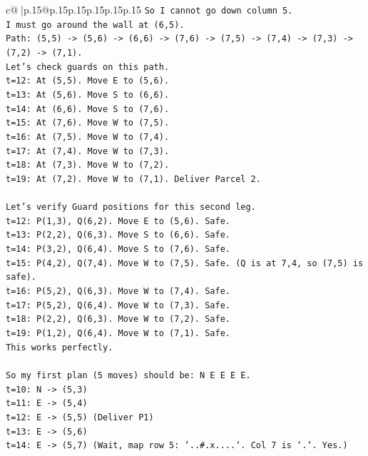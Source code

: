 \documentclass{article}
\begin{document}
{\begin{supertabular}{c@{$\;$}|p{.15\linewidth}@{}p{.15\linewidth}p{.15\linewidth}p{.15\linewidth}p{.15\linewidth}p{.15\linewidth}}
{{{\texttt{So I cannot go down column 5.} \\
\texttt{I must go around the wall at (6,5).} \\
\texttt{Path: (5,5) {-}> (5,6) {-}> (6,6) {-}> (7,6) {-}> (7,5) {-}> (7,4) {-}> (7,3) {-}> (7,2) {-}> (7,1).} \\
\texttt{Let's check guards on this path.} \\
\texttt{t=12: At (5,5). Move E to (5,6).} \\
\texttt{t=13: At (5,6). Move S to (6,6).} \\
\texttt{t=14: At (6,6). Move S to (7,6).} \\
\texttt{t=15: At (7,6). Move W to (7,5).} \\
\texttt{t=16: At (7,5). Move W to (7,4).} \\
\texttt{t=17: At (7,4). Move W to (7,3).} \\
\texttt{t=18: At (7,3). Move W to (7,2).} \\
\texttt{t=19: At (7,2). Move W to (7,1). Deliver Parcel 2.} \\
\\ 
\texttt{Let's verify Guard positions for this second leg.} \\
\texttt{t=12: P(1,3), Q(6,2). Move E to (5,6). Safe.} \\
\texttt{t=13: P(2,2), Q(6,3). Move S to (6,6). Safe.} \\
\texttt{t=14: P(3,2), Q(6,4). Move S to (7,6). Safe.} \\
\texttt{t=15: P(4,2), Q(7,4). Move W to (7,5). Safe. (Q is at 7,4, so (7,5) is safe).} \\
\texttt{t=16: P(5,2), Q(6,3). Move W to (7,4). Safe.} \\
\texttt{t=17: P(5,2), Q(6,4). Move W to (7,3). Safe.} \\
\texttt{t=18: P(2,2), Q(6,3). Move W to (7,2). Safe.} \\
\texttt{t=19: P(1,2), Q(6,4). Move W to (7,1). Safe.} \\
\texttt{This works perfectly.} \\
\\ 
\texttt{So my first plan (5 moves) should be: N E E E E.} \\
\texttt{t=10: N {-}> (5,3)} \\
\texttt{t=11: E {-}> (5,4)} \\
\texttt{t=12: E {-}> (5,5) (Deliver P1)} \\
\texttt{t=13: E {-}> (5,6)} \\
\texttt{t=14: E {-}> (5,7) (Wait, map row 5: `..\#.x....`. Col 7 is `.`. Yes.)} \\
}}}
\end{supertabular}}
\end{document}
